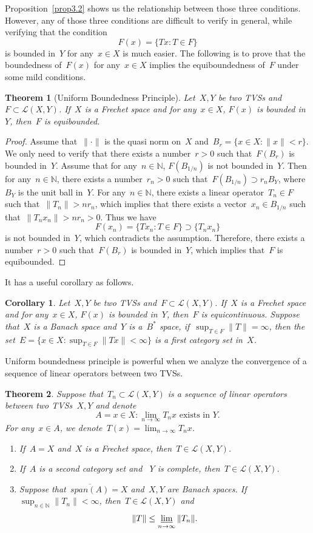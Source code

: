 \documentclass[12pt,a4paper,draft]{article}  %
\newtheorem{theorem}{Theorem}[section]
\newtheorem{corollary}{Corollary}[section]
\theoremstyle{definition}
\numberwithin{equation}{section}
\newcommand{\NN}{\mathbb{N}}
\begin{document}
Proposition~\eqref{prop3.2} shows us the relationship between those three conditions.
However, any of those three conditions are difficult to verify in general, 
while verifying that the condition
$$ F(x)=\{Tx: T \in F \} $$
is bounded in~$Y$ for any~$x \in X$ is much easier.
The following is to prove that the boundedness of~$F(x)$ for any~$x \in X$ implies the equiboundedness of~$F$ under some mild conditions.
\begin{theorem}[Uniform Boundedness Principle]
    Let~$X,Y$ be two TVSs and~$F \subset \mathcal{L}(X,Y)$.
    If~$X$ is a Frechet space and for any~$x \in X$, $F(x)$ is bounded in~$Y$, then~$F$ is equibounded.
\end{theorem}
\begin{proof}
    Assume that~$\|\cdot\|$ is the quasi norm on~$X$ and~$B_r = \{x \in X: \|x\| < r\}$.
    We only need to verify that there exists a number~$r > 0$ such that~$F(B_r)$ is bounded in~$Y$.
    Assume that for any~$n \in \NN$, $F(B_{1/n})$ is not bounded in~$Y$.
    Then for any~$n \in \NN$, there exists a number~$r_n > 0$ such that~$F(B_{1/n}) \supset r_n B_Y$, where~$B_Y$ is the unit ball in~$Y$.
    For any~$n \in \NN$, there exists a linear operator~$T_n \in F$ such that~$\|T_n\| > nr_n$, which implies that there exists a vector~$x_n \in B_{1/n}$ such that~$\|T_n x_n\| > n r_n > 0$. 
    Thus we have
    $$ F(x_n) = \{Tx_n: T \in F\} \supset \{T_n x_n\} $$
    is not bounded in~$Y$, which contradicts the assumption.
    Therefore, there exists a number~$r > 0$ such that~$F(B_r)$ is bounded in~$Y$, which implies that~$F$ is equibounded.
\end{proof}
It has a useful corollary as follows.
\begin{corollary}
    Let~$X,Y$ be two TVSs and~$F \subset \mathcal{L}(X,Y)$.
    If~$X$ is a Frechet space and for any~$x \in X$, $F(x)$ is bounded in~$Y$, then~$F$ is equicontinuous.
    Suppose that~$X$ is a Banach space and~$Y$ is a~$B^{*}$ space, if~$\sup_{T \in F} \|T\| = \infty$, then the 
    set~$E = \{x \in X: \sup_{T \in F} \|Tx\| < \infty\}$ is a first category set in~$X$.
\end{corollary}
Uniform boundedness principle is powerful when we analyze the convergence of a sequence of linear operators between two TVSs.
\begin{theorem}
    Suppose that~${T_n} \subset \mathcal{L}(X,Y)$ is a sequence of linear operators between two TVSs~$X,Y$ and denote
    $$ A={x \in X: \lim_{n \to \infty} T_n x \text{ exists in } Y}. $$
    For any~$x \in A$, we denote~$T(x) = \lim_{n \to \infty} T_n x$.
    \begin{enumerate}
        \item If~$A=X$ and~$X$ is a Frechet space, then~$T \in \mathcal{L}(X,Y)$.
        \item If~$A$ is a second category set and ~$Y$ is complete, then~$T \in \mathcal{L}(X,Y)$.
        \item Suppose that~$\overline{span(A)}=X$ and~$X,Y$ are Banach spaces. 
        If~$\sup_{n \in \NN} \|T_n\| < \infty$, then~$T \in \mathcal{L}(X,Y)$ and 
        $$  \|T\| \leq \varliminf_{n \to \infty} \|T_n\|. $$
    \end{enumerate}
\end{theorem}
\end{document}
